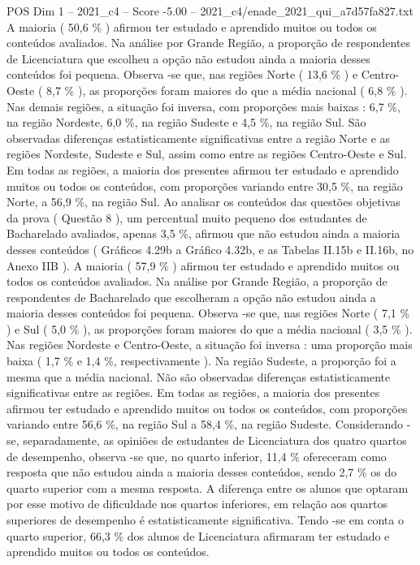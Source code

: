 \begin{textsample}{POS Dim 1 – 2021\_c4 – Score -5.00 – 2021\_c4/enade\_2021\_qui\_a7d57fa827.txt}
A maioria ( 50,6 \% ) afirmou ter estudado e aprendido muitos ou todos os conteúdos avaliados.
Na análise por Grande Região, a proporção de respondentes de Licenciatura que escolheu a opção não estudou ainda a maioria desses conteúdos foi pequena.
Observa -se que, nas regiões Norte ( 13,6 \% ) e Centro-Oeste ( 8,7 \% ), as proporções foram maiores do que a média nacional ( 6,8 \% ).
Nas demais regiões, a situação foi inversa, com proporções mais baixas : 6,7 \%, na região Nordeste, 6,0 \%, na região Sudeste e 4,5 \%, na região Sul.
São observadas diferenças estatisticamente significativas entre a região Norte e as regiões Nordeste, Sudeste e Sul, assim como entre as regiões Centro-Oeste e Sul.
Em todas as regiões, a maioria dos presentes afirmou ter estudado e aprendido muitos ou todos os conteúdos, com proporções variando entre 30,5 \%, na região Norte, a 56,9 \%, na região Sul.
Ao analisar os conteúdos das questões objetivas da prova ( Questão 8 ), um percentual muito pequeno dos estudantes de Bacharelado avaliados, apenas 3,5 \%, afirmou que não estudou ainda a maioria desses conteúdos ( Gráficos 4.29b a Gráfico 4.32b, e as Tabelas II.15b e II.16b, no Anexo IIB ).
A maioria ( 57,9 \% ) afirmou ter estudado e aprendido muitos ou todos os conteúdos avaliados.
Na análise por Grande Região, a proporção de respondentes de Bacharelado que escolheram a opção não estudou ainda a maioria desses conteúdos foi pequena.
Observa -se que, nas regiões Norte ( 7,1 \% ) e Sul ( 5,0 \% ), as proporções foram maiores do que a média nacional ( 3,5 \% ).
Nas regiões Nordeste e Centro-Oeste, a situação foi inversa : uma proporção mais baixa ( 1,7 \% e 1,4 \%, respectivamente ).
Na região Sudeste, a proporção foi a mesma que a média nacional.
Não são observadas diferenças estatisticamente significativas entre as regiões.
Em todas as regiões, a maioria dos presentes afirmou ter estudado e aprendido muitos ou todos os conteúdos, com proporções variando entre 56,6 \%, na região Sul a 58,4 \%, na região Sudeste.
Considerando -se, separadamente, as opiniões de estudantes de Licenciatura dos quatro quartos de desempenho, observa -se que, no quarto inferior, 11,4 \% ofereceram como resposta que não estudou ainda a maioria desses conteúdos, sendo 2,7 \% os do quarto superior com a mesma resposta.
A diferença entre os alunos que optaram por esse motivo de dificuldade nos quartos inferiores, em relação aos quartos superiores de desempenho é estatisticamente significativa.
Tendo -se em conta o quarto superior, 66,3 \% dos alunos de Licenciatura afirmaram ter estudado e aprendido muitos ou todos os conteúdos.

\end{textsample}
